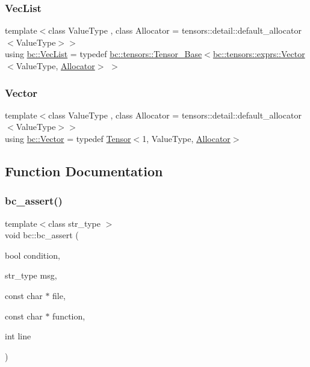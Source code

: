 \subsubsection{\texorpdfstring{Vec\+List}{VecList}}
{\footnotesize\ttfamily template$<$class Value\+Type , class Allocator  = tensors\+::detail\+::default\+\_\+allocator$<$\+Value\+Type$>$$>$ \\
using \hyperlink{namespacebc_acb7a07eb9e2d0927fcb611a35d99dc5c}{bc\+::\+Vec\+List} = typedef \hyperlink{classbc_1_1tensors_1_1Tensor__Base}{bc\+::tensors\+::\+Tensor\+\_\+\+Base}$<$\hyperlink{structbc_1_1tensors_1_1exprs_1_1Vector}{bc\+::tensors\+::exprs\+::\+Vector}$<$Value\+Type, \hyperlink{classbc_1_1allocators_1_1Allocator}{Allocator}$>$ $>$}

\mbox{\label{namespacebc_a14d40e8e95957f92a57853921837a15d}} 
\subsubsection{\texorpdfstring{Vector}{Vector}}
{\footnotesize\ttfamily template$<$class Value\+Type , class Allocator  = tensors\+::detail\+::default\+\_\+allocator$<$\+Value\+Type$>$$>$ \\
using \hyperlink{namespacebc_a14d40e8e95957f92a57853921837a15d}{bc\+::\+Vector} = typedef \hyperlink{namespacebc_a659391e47ab612be3ba6c18cf9c89159}{Tensor}$<$1, Value\+Type, \hyperlink{classbc_1_1allocators_1_1Allocator}{Allocator}$>$}



\subsection{Function Documentation}
\mbox{\label{namespacebc_abd3d44d6c60359e43ce37fb8983291bf}} 
\subsubsection{\texorpdfstring{bc\+\_\+assert()}{bc\_assert()}}
{\footnotesize\ttfamily template$<$class str\+\_\+type $>$ \\
void bc\+::bc\+\_\+assert (\begin{DoxyParamCaption}\item[{bool}]{condition,  }\item[{str\+\_\+type}]{msg,  }\item[{const char $\ast$}]{file,  }\item[{const char $\ast$}]{function,  }\item[{int}]{line }\end{DoxyParamCaption})\hspace{0.3cm}{\ttfamily [inline]}}

